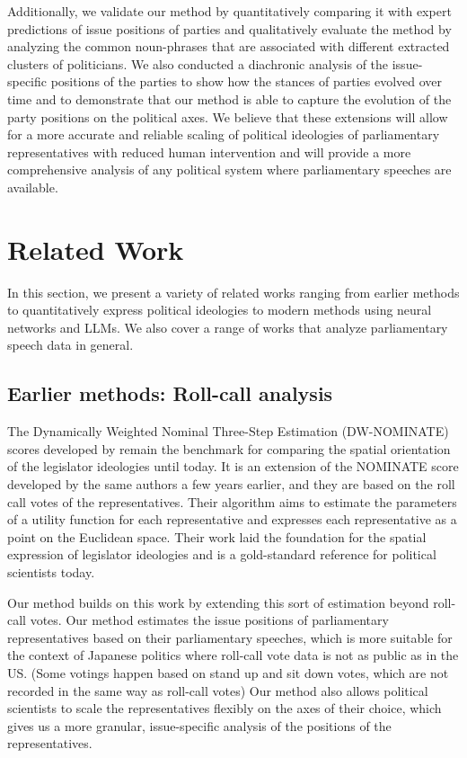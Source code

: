 \documentclass[final,5p,times,twocolumn,authoryear]{elsarticle}
\begin{document}
Additionally, we validate our method by quantitatively comparing it with expert predictions of issue positions of parties and qualitatively evaluate the method by analyzing the common noun-phrases that are associated with different extracted clusters of politicians. We also conducted a diachronic analysis of the issue-specific positions of the parties to show how the stances of parties evolved over time and to demonstrate that our method is able to capture the evolution of the party positions on the political axes.
We believe that these extensions will allow for a more accurate and reliable scaling of political ideologies of parliamentary representatives with reduced human intervention and will provide a more comprehensive analysis of any political system where parliamentary speeches are available.




\section{Related Work}
In this section, we present a variety of related works ranging from earlier methods to quantitatively express political ideologies to modern methods using neural networks and LLMs. We also cover a range of works that analyze parliamentary speech data in general.

\subsection{Earlier methods: Roll-call analysis}

The Dynamically Weighted Nominal Three-Step Estimation (DW-NOMINATE) scores developed by \citeauthor{dw-nominate} remain the benchmark for comparing the spatial orientation of the legislator ideologies until today. It is an extension of the NOMINATE score \citep{spatial-model-for-legislative-roll-call} developed by the same authors a few years earlier, and they are based on the roll call votes of the representatives. Their algorithm aims to estimate the parameters of a utility function for each representative and expresses each representative as a point on the Euclidean space. Their work laid the foundation for the spatial expression of legislator ideologies and is a gold-standard reference for political scientists today.

Our method builds on this work by extending this sort of estimation beyond roll-call votes. Our method estimates the issue positions of parliamentary representatives based on their parliamentary speeches, which is more suitable for the context of Japanese politics where roll-call vote data is not as public as in the US. (Some votings happen based on stand up and sit down votes, which are not recorded in the same way as roll-call votes) Our method also allows political scientists to scale the representatives flexibly on the axes of their choice, which gives us a more granular, issue-specific analysis of the positions of the representatives. 
\end{document}
